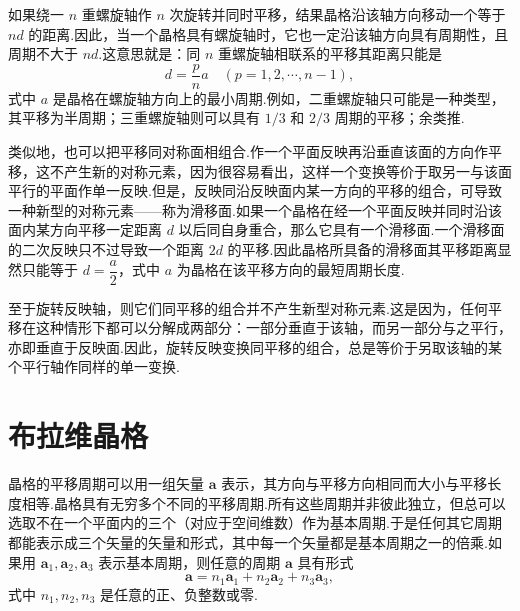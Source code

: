 如果绕一 $n$ 重螺旋轴作 $n$ 次旋转并同时平移，结果晶格沿该轴方向移动一个等于 $nd$ 的距离.因此，当一个晶格具有螺旋轴时，它也一定沿该轴方向具有周期性，且周期不大于 $nd$.这意思就是：同 $n$ 重螺旋轴相联系的平移其距离只能是
\begin{equation*}
  d=\frac{p}{n}a\quad(p=1,2,\cdots,n-1),
\end{equation*}
式中 $a$ 是晶格在螺旋轴方向上的最小周期.例如，二重螺旋轴只可能是一种类型，其平移为半周期；三重螺旋轴则可以具有 $1/3$ 和 $2/3$ 周期的平移；余类推.

类似地，也可以把平移同对称面相组合.作一个平面反映再沿垂直该面的方向作平移，这不产生新的对称元素，因为很容易看出，这样一个变换等价于取另一与该面平行的平面作单一反映.但是，反映同沿反映面内某一方向的平移的组合，可导致一种新型的对称元素——称为滑移面.如果一个晶格在经一个平面反映并同时沿该面内某方向平移一定距离 $d$ 以后同自身重合，那么它具有一个滑移面.一个滑移面的二次反映只不过导致一个距离 $2d$ 的平移.因此晶格所具备的滑移面其平移距离显然只能等于 $d=\dfrac{a}{2}$，式中 $a$ 为晶格在该平移方向的最短周期长度.

至于旋转反映轴，则它们同平移的组合并不产生新型对称元素.这是因为，任何平移在这种情形下都可以分解成两部分：一部分垂直于该轴，而另一部分与之平行，亦即垂直于反映面.因此，旋转反映变换同平移的组合，总是等价于另取该轴的某个平行轴作同样的单一变换.

\section{布拉维晶格}

晶格的平移周期可以用一组矢量 $\boldsymbol{a}$ 表示，其方向与平移方向相同而大小与平移长度相等.晶格具有无穷多个不同的平移周期.所有这些周期并非彼此独立，但总可以选取不在一个平面内的三个（对应于空间维数）作为基本周期.于是任何其它周期都能表示成三个矢量的矢量和形式，其中每一个矢量都是基本周期之一的倍乘.如果用 $\boldsymbol{a}_1,\boldsymbol{a}_2,\boldsymbol{a}_3$ 表示基本周期，则任意的周期 $\boldsymbol{a}$ 具有形式
\begin{equation}
  \boldsymbol{a}=n_1\boldsymbol{a}_1+n_2\boldsymbol{a}_2+n_3\boldsymbol{a}_3,
\end{equation}
式中 $n_1,n_2,n_3$ 是任意的正、负整数或零.

